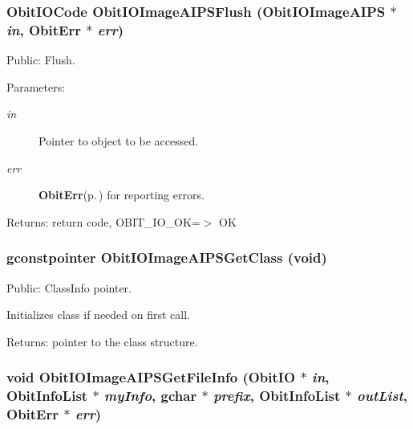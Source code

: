 \subsubsection{\setlength{\rightskip}{0pt plus 5cm}Obit\-IOCode Obit\-IOImage\-AIPSFlush ({\bf Obit\-IOImage\-AIPS} $\ast$ {\em in}, {\bf Obit\-Err} $\ast$ {\em err})}\label{ObitIOImageAIPS_8c_a19}


Public: Flush. 

\begin{Desc}
\item[Parameters:]
\begin{description}
\item[{\em in}]Pointer to object to be accessed. \item[{\em err}]{\bf Obit\-Err}{\rm (p.\,\pageref{structObitErr})} for reporting errors. \end{description}
\end{Desc}
\begin{Desc}
\item[Returns:]return code, OBIT\_\-IO\_\-OK=$>$ OK \end{Desc}
\subsubsection{\setlength{\rightskip}{0pt plus 5cm}gconstpointer Obit\-IOImage\-AIPSGet\-Class (void)}\label{ObitIOImageAIPS_8c_a7}


Public: Class\-Info pointer. 

Initializes class if needed on first call. \begin{Desc}
\item[Returns:]pointer to the class structure. \end{Desc}
\subsubsection{\setlength{\rightskip}{0pt plus 5cm}void Obit\-IOImage\-AIPSGet\-File\-Info ({\bf Obit\-IO} $\ast$ {\em in}, {\bf Obit\-Info\-List} $\ast$ {\em my\-Info}, gchar $\ast$ {\em prefix}, {\bf Obit\-Info\-List} $\ast$ {\em out\-List}, {\bf Obit\-Err} $\ast$ {\em err})}\label{ObitIOImageAIPS_8c_a23}


